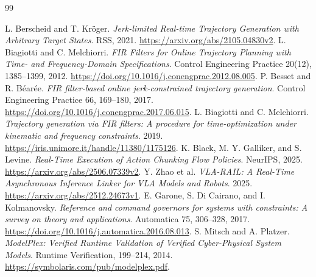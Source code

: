 \documentclass[11pt,letterpaper]{article}
\begin{document}
\newpage
\begin{thebibliography}{99}\small\raggedright
{} L. Berscheid and T. Kr\"oger.
\emph{Jerk-limited Real-time Trajectory Generation with Arbitrary Target States}.
RSS, 2021. \url{https://arxiv.org/abs/2105.04830v2}.
 L. Biagiotti and C. Melchiorri.
\emph{FIR Filters for Online Trajectory Planning with Time- and Frequency-Domain Specifications}. Control Engineering Practice 20(12), 1385--1399, 2012.
\url{https://doi.org/10.1016/j.conengprac.2012.08.005}.
 P. Besset and R. B\'ear\'ee.
\emph{FIR filter-based online jerk-constrained trajectory generation}. Control Engineering Practice 66, 169--180, 2017.
\url{https://doi.org/10.1016/j.conengprac.2017.06.015}.
 L. Biagiotti and C. Melchiorri.
\emph{Trajectory generation via FIR filters: A procedure for time-optimization under kinematic and frequency constraints}. 2019.
\url{https://iris.unimore.it/handle/11380/1175126}.
 K. Black, M. Y. Galliker, and S. Levine.
\emph{Real-Time Execution of Action Chunking Flow Policies}. NeurIPS, 2025.
\url{https://arxiv.org/abs/2506.07339v2}.
 Y. Zhao et al.
\emph{VLA-RAIL: A Real-Time Asynchronous Inference Linker for VLA Models and Robots}. 2025.
\url{https://arxiv.org/abs/2512.24673v1}.
 E. Garone, S. Di Cairano, and I. Kolmanovsky.
\emph{Reference and command governors for systems with constraints: A survey on theory and applications}.
Automatica 75, 306--328, 2017. \url{https://doi.org/10.1016/j.automatica.2016.08.013}.
 S. Mitsch and A. Platzer.
\emph{ModelPlex: Verified Runtime Validation of Verified Cyber-Physical System Models}.
Runtime Verification, 199--214, 2014.
\url{https://symbolaris.com/pub/modelplex.pdf}.


\end{thebibliography}
\end{document}
